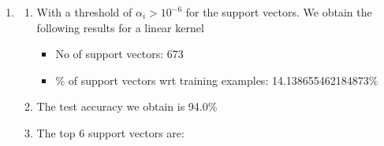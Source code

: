 \documentclass[12pt]{article}
\begin{document}
\begin{enumerate}[label=(\alph*)]
    \item \begin{enumerate}[label=\roman*.]
        \item With a threshold of $\alpha_i > 10^{-6}$ for the support vectors. We obtain the following results for a linear kernel
        \begin{itemize}
            \item No of support vectors: 673
            \item \% of support vectors wrt training examples: 14.138655462184873\%
        \end{itemize}
        \item The test accuracy we obtain is 94.0\%
        \item The top 6 support vectors are:


\end{enumerate}
\end{enumerate}
\end{document}

